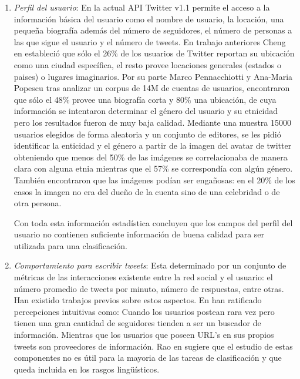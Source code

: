     \begin{enumerate}
        \item \emph{Perfil del usuario}: En la actual API Twitter v1.1 permite el acceso a la información básica del
        usuario como el nombre de usuario, la locación, una pequeña biografía además del número de seguidores, el número
        de personas a las que sigue el usuario y el número de tweets. En trabajo anteriores Cheng en \cite{Cheng:2010:YYT:1871437.1871535} estableció que sólo el 26\% de los usuarios
         de Twitter reportan su ubicación como una ciudad específica, el resto provee locaciones generales (estados o
         paises) o lugares imaginarios. Por su parte Marco Pennacchiotti y Ana-Maria Popescu tras analizar un corpus de
         14M de cuentas de usuarios, encontraron que sólo el 48\% provee una biografía corta y 80\% una ubicación, de cuya
         información se intentaron determinar el género del usuario y su etnicidad pero los resultados fueron de muy baja
         calidad. Mediante una muestra 15000 usuarios elegidos de forma aleatoria y un conjunto de editores, se les pidió
         identificar la enticidad y el género a partir de la imagen del avatar de twitter obteniendo que menos del 50\% de
         las imágenes se correlacionaba de manera clara con alguna etnia mientras que el 57\% se correspondía con algún
         género. También encontraron que las imágenes podían ser engañosas: en el 20\% de los casos la imagen no era del
         dueño de la cuenta sino de una celebridad o de otra persona.
         
         Con toda esta información estadística concluyen que los campos del perfil del usuario no contienen suficiente
         información de buena calidad para ser utilizada para una clasificación.
       
        \item \emph{Comportamiento para escribir tweets}:    Esta determinado por un conjunto de métricas de las interacciones
        existente entre la red social y el usuario: el número promedio de tweets por minuto, número de respuestas, entre
        otras. Han existido trabajos previos sobre estos aspectos. En \cite{JavaEtAl:07} han ratificado percepciones
        intuitivas como: Cuando los usuarios postean rara vez pero tienen una gran cantidad de seguidores tienden a ser un
        buscador de información. Mientras que los usuarios que poseen URL's en sus propios tweets son proveedores de
        información. Rao en \cite{Rao:2010:CLU:1871985.1871993} sugiere que el estudio de estas componentes no es útil para la
        mayoria de las tareas de clasificación y que queda incluida en los rasgos lingüísticos.
       

\end{enumerate}
